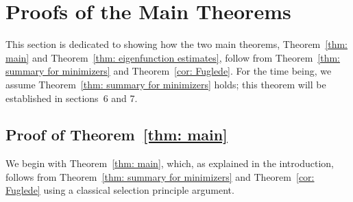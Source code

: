 \documentclass[10pt,a4paper]{amsart}
\numberwithin{equation}{section}
\providecommand{\href}[2]{#2}
\begin{document}
  
 
\section{Proofs of the Main Theorems}\label{sec: proofs of main theorems}
This section is dedicated to showing how the two main theorems, Theorem~\ref{thm: main} and Theorem~\ref{thm: eigenfunction estimates}, follow from Theorem~\ref{thm: summary for minimizers} and Theorem~\ref{cor: Fuglede}. For the time being, we assume Theorem~\ref{thm: summary for minimizers} holds; this theorem will be established in sections~\href{https://arxiv.org/abs/2504.13053v2}{6} and \href{https://arxiv.org/abs/2504.13053v2}{7}. 

\subsection{Proof of Theorem~\ref{thm: main}}\label{ssec: proof of main}
We begin with Theorem~\ref{thm: main}, which, as explained in the introduction, follows from Theorem~\ref{thm: summary for minimizers} and Theorem~\ref{cor: Fuglede} using a classical selection principle argument.
\end{document}
